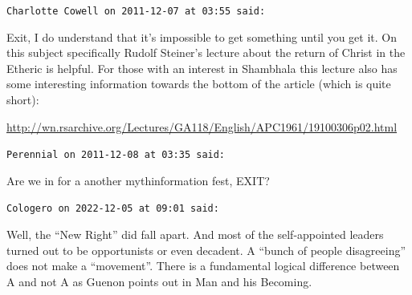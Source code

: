 \begin{footnotesize}
\begin{sffamily}
\hfill

\texttt{Charlotte Cowell on 2011-12-07 at 03:55 said:}

Exit, I do understand that it's impossible to get something until you get it. On this subject specifically Rudolf Steiner's lecture about the return of Christ in the Etheric is helpful. For those with an interest in Shambhala this lecture also has some interesting information towards the bottom of the article (which is quite short):

\url{http://wn.rsarchive.org/Lectures/GA118/English/APC1961/19100306p02.html}


\hfill

\texttt{Perennial on 2011-12-08 at 03:35 said:}

Are we in for a another mythinformation fest, EXIT?

\hfill

\texttt{Cologero on 2022-12-05 at 09:01 said:}

Well, the ``New Right'' did fall apart. And most of the self-appointed leaders turned out to be opportunists or even decadent. A ``bunch of people disagreeing'' does not make a ``movement''. There is a fundamental logical difference between A and not A as Guenon points out in Man and his Becoming.


\hfill

\end{sffamily}
\end{footnotesize}

